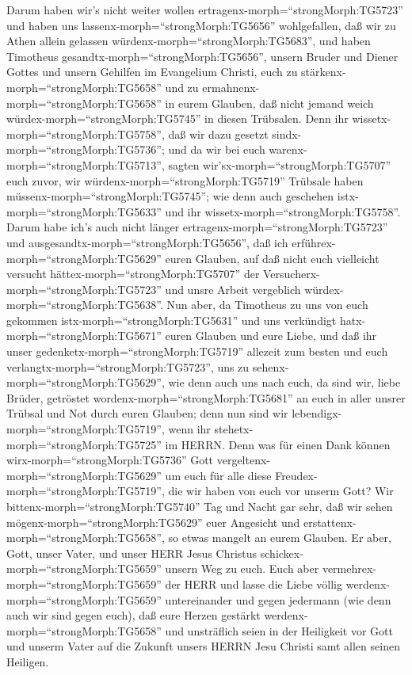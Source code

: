  Darum haben wir's nicht weiter wollen
ertragenx-morph=``strongMorph:TG5723'' und haben uns
lassenx-morph=``strongMorph:TG5656'' wohlgefallen, daß wir zu Athen
allein gelassen würdenx-morph=``strongMorph:TG5683'',  und
haben Timotheus gesandtx-morph=``strongMorph:TG5656'', unsern Bruder und
Diener Gottes und unsern Gehilfen im Evangelium Christi, euch zu
stärkenx-morph=``strongMorph:TG5658'' und zu
ermahnenx-morph=``strongMorph:TG5658'' in eurem Glauben, 
daß nicht jemand weich würdex-morph=``strongMorph:TG5745'' in diesen
Trübsalen. Denn ihr wissetx-morph=``strongMorph:TG5758'', daß wir dazu
gesetzt sindx-morph=``strongMorph:TG5736'';  und da wir bei
euch warenx-morph=``strongMorph:TG5713'', sagten
wir'sx-morph=``strongMorph:TG5707'' euch zuvor, wir
würdenx-morph=``strongMorph:TG5719'' Trübsale haben
müssenx-morph=``strongMorph:TG5745''; wie denn auch geschehen
istx-morph=``strongMorph:TG5633'' und ihr
wissetx-morph=``strongMorph:TG5758''.  Darum habe ich's auch
nicht länger ertragenx-morph=``strongMorph:TG5723'' und
ausgesandtx-morph=``strongMorph:TG5656'', daß ich
erführex-morph=``strongMorph:TG5629'' euren Glauben, auf daß nicht euch
vielleicht versucht hättex-morph=``strongMorph:TG5707'' der
Versucherx-morph=``strongMorph:TG5723'' und unsre Arbeit vergeblich
würdex-morph=``strongMorph:TG5638''.  Nun aber, da Timotheus
zu uns von euch gekommen istx-morph=``strongMorph:TG5631'' und uns
verkündigt hatx-morph=``strongMorph:TG5671'' euren Glauben und eure
Liebe, und daß ihr unser gedenketx-morph=``strongMorph:TG5719'' allezeit
zum besten und euch verlangtx-morph=``strongMorph:TG5723'', uns zu
sehenx-morph=``strongMorph:TG5629'', wie denn auch uns nach euch,
 da sind wir, liebe Brüder, getröstet
wordenx-morph=``strongMorph:TG5681'' an euch in aller unsrer Trübsal und
Not durch euren Glauben;  denn nun sind wir
lebendigx-morph=``strongMorph:TG5719'', wenn ihr
stehetx-morph=``strongMorph:TG5725'' im HERRN.  Denn was für
einen Dank können wirx-morph=``strongMorph:TG5736'' Gott
vergeltenx-morph=``strongMorph:TG5629'' um euch für alle diese
Freudex-morph=``strongMorph:TG5719'', die wir haben von euch vor unserm
Gott?  Wir bittenx-morph=``strongMorph:TG5740'' Tag und
Nacht gar sehr, daß wir sehen mögenx-morph=``strongMorph:TG5629'' euer
Angesicht und erstattenx-morph=``strongMorph:TG5658'', so etwas mangelt
an eurem Glauben.  Er aber, Gott, unser Vater, und unser
HERR Jesus Christus schickex-morph=``strongMorph:TG5659'' unsern Weg zu
euch.  Euch aber vermehrex-morph=``strongMorph:TG5659'' der
HERR und lasse die Liebe völlig werdenx-morph=``strongMorph:TG5659''
untereinander und gegen jedermann (wie denn auch wir sind gegen euch),
 daß eure Herzen gestärkt
werdenx-morph=``strongMorph:TG5658'' und unsträflich seien in der
Heiligkeit vor Gott und unserm Vater auf die Zukunft unsers HERRN Jesu
Christi samt allen seinen Heiligen.

